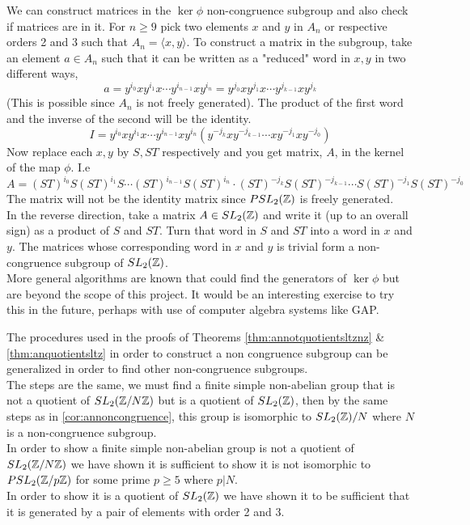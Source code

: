 \begin{remark}
We can construct matrices in the $\ker \phi$ non-congruence subgroup and also check if matrices are in it. For $n \geq 9$ pick two elements $x$ and $y$ in $A_n$ or respective orders 2 and 3 such that $A_n = \langle x , y\rangle$. To construct a matrix in the subgroup, take an element $a \in A_n$ such that it can be written as a "reduced" word in $x,y$ in two different ways, 
$$ a = y^{i_0}xy^{i_1}x \cdots y^{i_{n-1}}xy^{i_n} =  y^{j_0}xy^{j_1}x \cdots y^{j_{k-1}}xy^{j_k}$$
(This is possible since $A_n$ is not freely generated). The product of the first word and the inverse of the second will be the identity. 
$$I = y^{i_0}xy^{i_1}x \cdots y^{i_{n-1}}xy^{i_n}( y^{-j_k}xy^{-j_{k-1}} \cdots xy^{-j_1}xy^{-j_0} )$$
Now replace each $x,y$ by $S, ST$ respectively and you get matrix, $A$, in the kernel of the map $\phi$. I.e 
$$A = (ST)^{i_0}S(ST)^{i_1}S \cdots (ST)^{i_{n-1}}S(ST)^{i_n} \cdot (ST)^{-j_k}S(ST)^{-j_{k-1}} \cdots S(ST)^{-j_1}S(ST)^{-j_0}$$
The matrix will not be the identity matrix since $\psltz$ is freely generated.\\
In the reverse direction, take a matrix $A \in \sltz$ and write it (up to an overall sign) as a product of $S$ and $ST$. Turn that word in $S$ and $ST$ into a word in $x$ and $y$. The matrices whose corresponding word in $x$ and $y$ is trivial form a non-congruence subgroup of $\sltz$. \\

More general algorithms are known that could find the generators of $\ker \phi$ but are beyond the scope of this project. It would be an interesting exercise to try this in the future, perhaps with use of computer algebra systems like GAP. 
\end{remark}

\begin{remark}
The procedures used in the proofs of Theorems \ref{thm:annotquotientsltznz} \& \ref{thm:anquotientsltz} in order to construct a non congruence subgroup can be generalized in order to find other non-congruence subgroups.\\
The steps are the same, we must find a finite simple non-abelian group that is not a quotient of $\sltznz$ but is a quotient of $\sltz$, then by the same steps as in \ref{cor:annoncongruence}, this group is isomorphic to $\sltz /N $ where $N$ is a non-congruence subgroup.\\
In order to show a finite simple non-abelian group is not a quotient of $\sltznz$ we have shown it is sufficient to show it is not isomorphic to $\psltznz[p]$ for some prime $p \geq 5$ where $p \vert N$.\\
In order to show it is a quotient of $\sltz$ we have shown it to be sufficient that it is generated by a pair of elements with order 2 and 3. \\
\end{remark}

